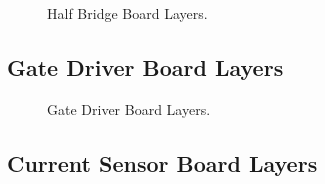 \begin{figure}[H]
\begin{subfigmatrix}{4}
	\end{subfigmatrix}
	\caption{Half Bridge Board Layers.}
	\label{fig:half_bridge_board_layers}
\end{figure}

\def\excerpt{\subsection{Gate Driver Board Schematic}\label{section:gate_driver_files}}


\subsection{Gate Driver Board Layers}
\begin{figure}[H]
	\centering
	\begin{subfigmatrix}{2}
		\hfill{ }
		\hfill{ }
	\end{subfigmatrix}
	\begin{subfigmatrix}{2}
		\hfill{ }
		\hfill{ }
	\end{subfigmatrix}
	\caption{Gate Driver Board Layers.}
	\label{fig:gate_driver_board_layers}
\end{figure}

\def\excerpt{\subsection{Current Sensor Board Schematic}\label{section:current_sensor_files}}


\subsection{Current Sensor Board Layers}
